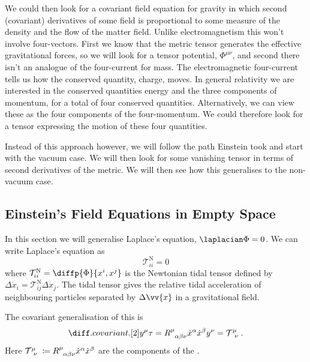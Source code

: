\documentclass[fleqn]{NotesClass}
\begin{document}
    We could then look for a covariant field equation for gravity in which second (covariant) derivatives of some field is proportional to some measure of the density and the flow of the matter field.
    Unlike electromagnetism this won't involve four-vectors.
    First we know that the metric tensor generates the effective gravitational forces, so we will look for a tensor potential, \(\Phi^{\mu\nu}\), and second there isn't an analogue of the four-current for mass.
    The electromagnetic four-current tells us how the conserved quantity, charge, moves.
    In general relativity we are interested in the conserved quantities energy and the three components of momentum, for a total of four conserved quantities.
    Alternatively, we can view these as the four components of the four-momentum.
    We could therefore look for a tensor expressing the motion of these four quantities.
    
    Instead of this approach however, we will follow the path Einstein took and start with the vacuum case.
    We will then look for some vanishing tensor in terms of second derivatives of the metric.
    We will then see how this generalises to the non-vacuum case.
    
    \subsection{Einstein's Field Equations in Empty Space}
    In this section we will generalise Laplace's equation, \(\laplacian\Phi = 0\).
    We can write Laplace's equation as
    \begin{equation}
        \mathcal{T}^{\mathrm{N}}_{ii} = 0
    \end{equation}
    where \(\mathcal{T}^{\mathrm{N}}_{ii} = \diffp{\Phi}{x^i, x^j}\) is the Newtonian tidal tensor defined by \(\Delta \ddot{x}_i = \mathcal{T}^{\mathrm{N}}_{ij} \Delta x_j\).
    The tidal tensor gives the relative tidal acceleration of neighbouring particles separated by \(\Delta \vv{x}\) in a gravitational field.
    
    The covariant generalisation of this is
    \begin{equation}
        \diffcov[2]{y^\mu}{\tau} = \tensor{R}{^\mu_{\alpha\beta\nu}} \dot{x}^\alpha \dot{x}^\beta y^\nu = \tensor{\mathcal{T}}{^\mu_\nu}.
    \end{equation}
    Here \(\tensor{\mathcal{T}}{^\mu_\nu} \coloneqq \tensor{R}{^\mu_{\alpha\beta\nu}}\dot{x}^\alpha\dot{x}^\beta\) are the components of the .
    
\end{document}
